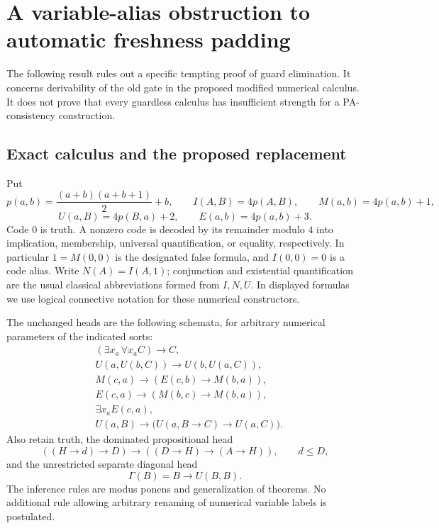 \section{A variable-alias obstruction to automatic freshness padding}
\label{sec:padding-obstruction}

The following result rules out a specific tempting proof of guard
elimination. It concerns derivability of the old gate in the proposed
modified numerical calculus. It does not prove that every guardless
calculus has insufficient strength for a PA-consistency construction.

\subsection{Exact calculus and the proposed replacement}

Put
\[
 p(a,b)=\frac{(a+b)(a+b+1)}2+b,\qquad
 I(A,B)=4p(A,B),\qquad M(a,b)=4p(a,b)+1,
\]
\[
 U(a,B)=4p(B,a)+2,\qquad E(a,b)=4p(a,b)+3.
\]
Code $0$ is truth. A nonzero code is decoded by its remainder modulo
$4$ into implication, membership, universal quantification, or equality,
respectively. In particular $1=M(0,0)$ is the designated false formula,
and $I(0,0)=0$ is a code alias. Write $N(A)=I(A,1)$; conjunction and
existential quantification are the usual classical abbreviations formed
from $I,N,U$. In displayed formulas we use logical connective notation
for these numerical constructors.

The unchanged heads are the following schemata, for arbitrary numerical
parameters of the indicated sorts:
\begin{align*}
 &(\exists x_a\,\forall x_a C)\to C, \tag{H1}\\
 &U(a,U(b,C))\to U(b,U(a,C)), \tag{H2}\\
 &M(c,a)\to(E(c,b)\to M(b,a)), \tag{H3}\\
 &E(c,a)\to(M(b,c)\to M(b,a)), \tag{H4}\\
 &\exists x_a E(c,a), \tag{H5}\\
 &U(a,B)\to\bigl(U(a,B\to C)\to U(a,C)\bigr). \tag{H6}
\end{align*}
Also retain truth, the dominated propositional head
\[
 ((H\to d)\to D)\to((D\to H)\to(A\to H)),\qquad d\le D,
\]
and the unrestricted separate diagonal head
\[
 \Gamma(B)=B\to U(B,B).
\]
The inference rules are modus ponens and generalization of theorems.
No additional rule allowing arbitrary renaming of numerical variable
labels is postulated.

